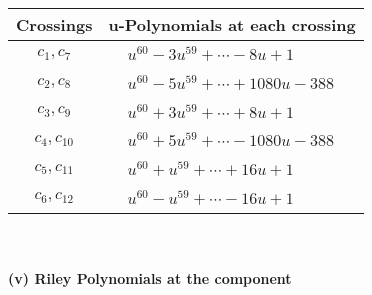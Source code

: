 \documentclass[1p]{elsarticle_modified}
\theoremstyle{definition}
\begin{document}
\begin{tabular}{m{50pt}|m{274pt}}
Crossings & \hspace{64pt}u-Polynomials at each crossing \\
\hline $$\begin{aligned}c_{1},c_{7}\end{aligned}$$&$\begin{aligned}
&u^{60}-3 u^{59}+\cdots-8 u+1
\end{aligned}$\\
\hline $$\begin{aligned}c_{2},c_{8}\end{aligned}$$&$\begin{aligned}
&u^{60}-5 u^{59}+\cdots+1080 u-388
\end{aligned}$\\
\hline $$\begin{aligned}c_{3},c_{9}\end{aligned}$$&$\begin{aligned}
&u^{60}+3 u^{59}+\cdots+8 u+1
\end{aligned}$\\
\hline $$\begin{aligned}c_{4},c_{10}\end{aligned}$$&$\begin{aligned}
&u^{60}+5 u^{59}+\cdots-1080 u-388
\end{aligned}$\\
\hline $$\begin{aligned}c_{5},c_{11}\end{aligned}$$&$\begin{aligned}
&u^{60}+u^{59}+\cdots+16 u+1
\end{aligned}$\\
\hline $$\begin{aligned}c_{6},c_{12}\end{aligned}$$&$\begin{aligned}
&u^{60}- u^{59}+\cdots-16 u+1
\end{aligned}$\\
\hline
\end{tabular}\\~\\
\newpage\renewcommand{\arraystretch}{1}
\flushleft \textbf{(v) Riley Polynomials at the component}\newline \\
\end{document}
